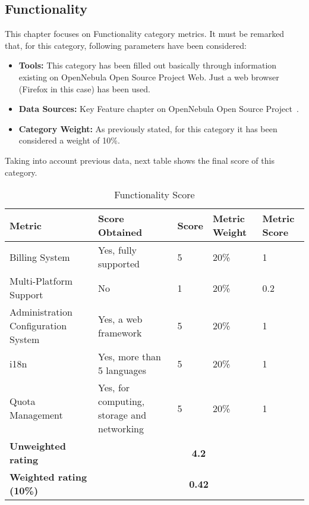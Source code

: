 \documentclass[11pt]{article}
\begin{document}
\subsection{Functionality}
This chapter focuses on Functionality category metrics. It must be remarked that, for this category, following parameters have been considered:
\begin{itemize}\itemsep0pt
\item{\textbf{Tools:}} This category has been filled out basically through information existing on OpenNebula Open Source Project Web. Just a web browser (Firefox in this case) has been used.
\item{\textbf{Data Sources:}} Key Feature chapter on OpenNebula Open Source Project~\cite{OPNEB00}.
\item{\textbf{Category Weight:}} As previously stated, for this category it has been considered a weight of 10\%.
\end{itemize}
Taking into account previous data, next table shows the final score of this category.
\begin{table}[H]
  \begin{center}
    \begin{tabular}{ | p{4cm} | p{3cm} | l | p{1.2cm} | p{1.2cm} | }
    \toprule
    \textbf{Metric} & \textbf{Score Obtained} & \textbf{Score} & \textbf{Metric Weight} & \textbf{Metric Score}\\
    \hline
    Billing System & Yes, fully supported & 5 & 20\% & 1\\
    \hline
    Multi-Platform Support & No & 1 & 20\% & 0.2\\
    \hline
    Administration Configuration System & Yes, a web framework & 5 & 20\% & 1\\
    \hline
    i18n & Yes, more than 5 languages & 5 & 20\% & 1\\
    \hline
    Quota Management & Yes, for computing, storage and networking & 5 & 20\% & 1\\
    \midrule
    \textbf{Unweighted rating} & \multicolumn{4}{c|}{\textbf{4.2}}\\
    \hline
    \textbf{Weighted rating (10\%)} & \multicolumn {4}{c|}{\textbf{0.42}}\\
    \bottomrule
    \end{tabular}
    \caption{Functionality Score}
    \label{tab:func_score}
  \end{center}
\end{table}
\end{document}

